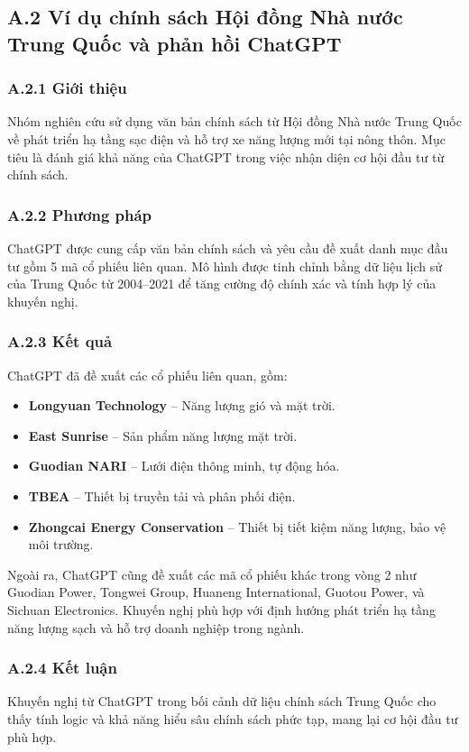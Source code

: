 \documentclass[a4paper,12pt]{article}
\begin{document}
\subsection*{A.2 Ví dụ chính sách Hội đồng Nhà nước Trung Quốc và phản hồi ChatGPT}

\subsubsection*{A.2.1 Giới thiệu}
Nhóm nghiên cứu sử dụng văn bản chính sách từ Hội đồng Nhà nước Trung Quốc về phát triển hạ tầng sạc điện và hỗ trợ xe năng lượng mới tại nông thôn. Mục tiêu là đánh giá khả năng của ChatGPT trong việc nhận diện cơ hội đầu tư từ chính sách.

\subsubsection*{A.2.2 Phương pháp}
ChatGPT được cung cấp văn bản chính sách và yêu cầu đề xuất danh mục đầu tư gồm 5 mã cổ phiếu liên quan. Mô hình được tinh chỉnh bằng dữ liệu lịch sử của Trung Quốc từ 2004–2021 để tăng cường độ chính xác và tính hợp lý của khuyến nghị.

\subsubsection*{A.2.3 Kết quả}
ChatGPT đã đề xuất các cổ phiếu liên quan, gồm:
\begin{itemize}
    \item \textbf{Longyuan Technology} – Năng lượng gió và mặt trời.
    \item \textbf{East Sunrise} – Sản phẩm năng lượng mặt trời.
    \item \textbf{Guodian NARI} – Lưới điện thông minh, tự động hóa.
    \item \textbf{TBEA} – Thiết bị truyền tải và phân phối điện.
    \item \textbf{Zhongcai Energy Conservation} – Thiết bị tiết kiệm năng lượng, bảo vệ môi trường.
\end{itemize}
Ngoài ra, ChatGPT cũng đề xuất các mã cổ phiếu khác trong vòng 2 như Guodian Power, Tongwei Group, Huaneng International, Guotou Power, và Sichuan Electronics. Khuyến nghị phù hợp với định hướng phát triển hạ tầng năng lượng sạch và hỗ trợ doanh nghiệp trong ngành.

\subsubsection*{A.2.4 Kết luận}
Khuyến nghị từ ChatGPT trong bối cảnh dữ liệu chính sách Trung Quốc cho thấy tính logic và khả năng hiểu sâu chính sách phức tạp, mang lại cơ hội đầu tư phù hợp.
\end{document}
